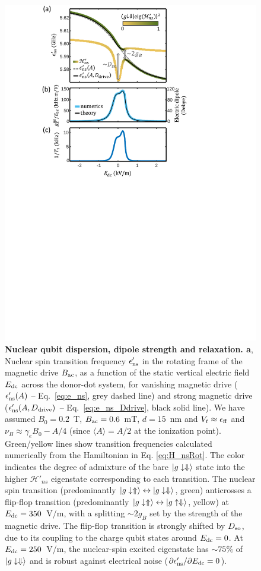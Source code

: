 \begin{figure}
\centering
	\includegraphics[width=0.9\columnwidth]{fig3_clock_v2}
	\caption[Nuclear qubit dispersion, dipole strength and relaxation]{
	\textbf{Nuclear qubit dispersion, dipole strength and relaxation. a}, Nuclear spin transition frequency $\epsilon'_{\rm ns}$ in the rotating frame of the magnetic drive $B_{\rm ac}$, as a function of the static vertical electric field $E_{\rm dc}$ across the donor-dot system, for vanishing magnetic drive ($\epsilon'_{\rm ns}(A)$ -- Eq.~\ref{eq:e_ns}, grey dashed line) and strong magnetic drive ($\epsilon'_{\rm ns}(A,D_{\rm drive})$ -- Eq.~\ref{eq:e_ns_Ddrive}, black solid line). We have assumed $B_0=0.2$~T, $B_{\rm ac}=0.6$~mT, $d=15$~nm and $V_t\approx \epsilon_{\rm ff}$ and $\nu_B\approx\gamma_eB_0-A/4$ (since $\langle A \rangle = A/2$ at the ionization point). Green/yellow lines show transition frequencies calculated numerically from the Hamiltonian in Eq. \ref{eq:H_nsRot}. The color indicates the degree of admixture of the bare $\ket{g\downarrow\Downarrow}$ state into the higher $\mathcal{H}'_{ns}$ eigenstate corresponding to each transition. The nuclear spin transition (predominantly $\ket{g\downarrow\Uparrow}\leftrightarrow\ket{g\downarrow\Downarrow}$, green) anticrosses a flip-flop transition (predominantly $\ket{g\downarrow\Uparrow}\leftrightarrow\ket{g\uparrow\Downarrow}$, yellow) at $E_{\rm dc}=350$~V/m, with a splitting $\sim2g_B$ set by the strength of the magnetic drive. The flip-flop transition is strongly shifted by $D_{\rm so}$, due to its coupling to the charge qubit states around $E_{\rm dc}=0$. At $E_{\rm dc}=250$~V/m, the nuclear-spin excited eigenstate has $\sim75\%$ of $\ket{g\downarrow\Downarrow}$ and is robust against electrical noise ($\partial\epsilon'_{\rm ns}/\partial E_{\rm dc}=0$).
}
\end{figure}
